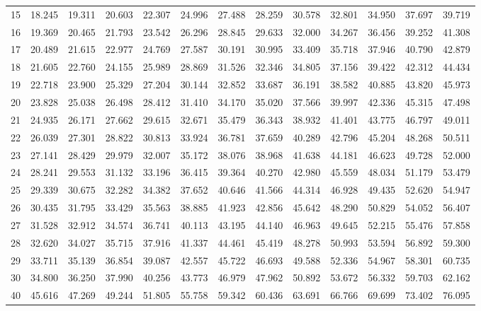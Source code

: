 \begin{table}[H]
\begin{tabular}{c|cccccccccccc}
15 & 18.245 & 19.311 & 20.603 & 22.307 & 24.996 & 27.488 & 28.259 & 30.578 & 32.801 & 34.950 & 37.697 & 39.719 \\
16 & 19.369 & 20.465 & 21.793 & 23.542 & 26.296 & 28.845 & 29.633 & 32.000 & 34.267 & 36.456 & 39.252 & 41.308 \\
17 & 20.489 & 21.615 & 22.977 & 24.769 & 27.587 & 30.191 & 30.995 & 33.409 & 35.718 & 37.946 & 40.790 & 42.879 \\
18 & 21.605 & 22.760 & 24.155 & 25.989 & 28.869 & 31.526 & 32.346 & 34.805 & 37.156 & 39.422 & 42.312 & 44.434 \\
19 & 22.718 & 23.900 & 25.329 & 27.204 & 30.144 & 32.852 & 33.687 & 36.191 & 38.582 & 40.885 & 43.820 & 45.973 \\
20 & 23.828 & 25.038 & 26.498 & 28.412 & 31.410 & 34.170 & 35.020 & 37.566 & 39.997 & 42.336 & 45.315 & 47.498 \\
21 & 24.935 & 26.171 & 27.662 & 29.615 & 32.671 & 35.479 & 36.343 & 38.932 & 41.401 & 43.775 & 46.797 & 49.011 \\
22 & 26.039 & 27.301 & 28.822 & 30.813 & 33.924 & 36.781 & 37.659 & 40.289 & 42.796 & 45.204 & 48.268 & 50.511 \\
23 & 27.141 & 28.429 & 29.979 & 32.007 & 35.172 & 38.076 & 38.968 & 41.638 & 44.181 & 46.623 & 49.728 & 52.000 \\
24 & 28.241 & 29.553 & 31.132 & 33.196 & 36.415 & 39.364 & 40.270 & 42.980 & 45.559 & 48.034 & 51.179 & 53.479 \\
25 & 29.339 & 30.675 & 32.282 & 34.382 & 37.652 & 40.646 & 41.566 & 44.314 & 46.928 & 49.435 & 52.620 & 54.947 \\
26 & 30.435 & 31.795 & 33.429 & 35.563 & 38.885 & 41.923 & 42.856 & 45.642 & 48.290 & 50.829 & 54.052 & 56.407 \\
27 & 31.528 & 32.912 & 34.574 & 36.741 & 40.113 & 43.195 & 44.140 & 46.963 & 49.645 & 52.215 & 55.476 & 57.858 \\
28 & 32.620 & 34.027 & 35.715 & 37.916 & 41.337 & 44.461 & 45.419 & 48.278 & 50.993 & 53.594 & 56.892 & 59.300 \\
29 & 33.711 & 35.139 & 36.854 & 39.087 & 42.557 & 45.722 & 46.693 & 49.588 & 52.336 & 54.967 & 58.301 & 60.735 \\
30 & 34.800 & 36.250 & 37.990 & 40.256 & 43.773 & 46.979 & 47.962 & 50.892 & 53.672 & 56.332 & 59.703 & 62.162 \\
40 & 45.616 & 47.269 & 49.244 & 51.805 & 55.758 & 59.342 & 60.436 & 63.691 & 66.766 & 69.699 & 73.402 & 76.095 \\

\end{tabular}
\end{table}
